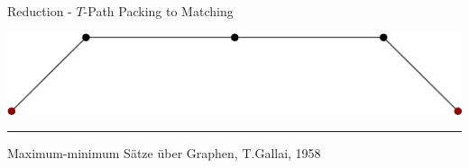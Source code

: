 \documentclass{beamer}
\begin{document}
\begin{frame}[t]{Reduction - $T$-Path Packing to Matching}
	\begin{minipage}[t][.4\textheight][t]{\linewidth}
		\centering
		\includegraphics[width=.5\textwidth]{figures/reductions/graph-orig.eps}
	\end{minipage}
	\hfill
	\begin{minipage}[t][.4\textheight][t]{\linewidth}
		\centering
	\end{minipage}
	\hrule
	{\tiny Maximum-minimum S{\"a}tze {\"u}ber Graphen, T.Gallai, 1958}
\end{frame}
\end{document}
